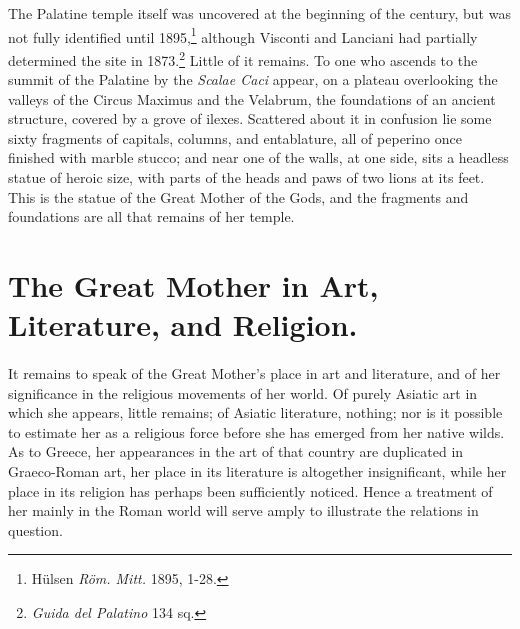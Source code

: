 \documentclass[a4paper, 11pt, oneside, polutonikogreek, english]{article}
\begin{document}
The Palatine temple itself was uncovered at the beginning of the century, but was not fully identified until 1895,\footnote{Hülsen \emph{Röm. Mitt.} 1895, 1-28.} although Visconti and Lanciani had partially determined the site in 1873.\footnote{\emph{Guida del Palatino} 134 sq.} Little of it remains. To one who ascends to the summit of the Palatine by the \emph{Scalae Caci} appear, on a plateau overlooking the valleys of the Circus Maximus and the Velabrum, the foundations of an ancient structure, covered by a grove of ilexes. Scattered about it in confusion lie some sixty fragments of capitals, columns, and entablature, all of peperino once finished with marble stucco; and near one of the walls, at one side, sits a headless statue of heroic size, with parts of the heads and paws of two lions at its feet. This is the statue of the Great Mother of the Gods, and the fragments and foundations are all that remains of her temple.
\clearpage
\section{The Great Mother in Art, Literature, and Religion.}
\paragraph{}
It remains to speak of the Great Mother's place in art and literature, and of her significance in the religious movements of her world. Of purely Asiatic art in which she appears, little remains; of Asiatic literature, nothing; nor is it possible to estimate her as a religious force before she has emerged from her native wilds. As to Greece, her appearances in the art of that country are duplicated in Graeco-Roman art, her place in its literature is altogether insignificant, while her place in its religion has perhaps been sufficiently noticed. Hence a treatment of her mainly in the Roman world will serve amply to illustrate the relations in question.
\end{document}
